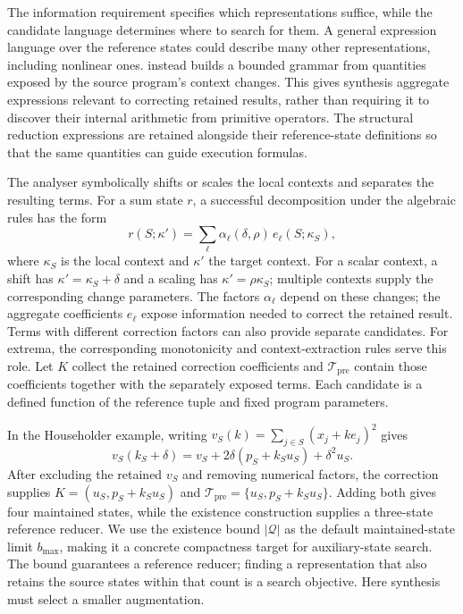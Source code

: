 The information requirement specifies which representations suffice, while the candidate language determines where to search for them.
A general expression language over the reference states could describe many other representations, including nonlinear ones.
\sys instead builds a bounded grammar from quantities exposed by the source program's context changes.
This gives synthesis aggregate expressions relevant to correcting retained results, rather than requiring it to discover their internal arithmetic from primitive operators.
The structural reduction expressions are retained alongside their reference-state definitions so that the same quantities can guide execution formulas.

The analyser symbolically shifts or scales the local contexts and separates the resulting terms.
For a sum state $r$, a successful decomposition under the algebraic rules has the form
\begin{equation}
\label{eq:features}
r(S;\kappa')=\sum_{\ell}\alpha_\ell(\delta,\rho)\,e_\ell(S;\kappa_S),
\end{equation}
where $\kappa_S$ is the local context and $\kappa'$ the target context.
For a scalar context, a shift has $\kappa'=\kappa_S+\delta$ and a scaling has $\kappa'=\rho\kappa_S$; multiple contexts supply the corresponding change parameters.
The factors $\alpha_\ell$ depend on these changes; the aggregate coefficients $e_\ell$ expose information needed to correct the retained result.
Terms with different correction factors can also provide separate candidates.
For extrema, the corresponding monotonicity and context-extraction rules serve this role.
Let $K$ collect the retained correction coefficients and $\mathcal T_{\mathrm{pre}}$ contain those coefficients together with the separately exposed terms.
Each candidate is a defined function of the reference tuple and fixed program parameters.

In the Householder example, writing $v_S(k)=\sum_{j\in S}(x_j+ke_j)^2$ gives
\[
v_S(k_S+\delta)
 =v_S+2\delta(p_S+k_Su_S)+\delta^2u_S.
\]
After excluding the retained $v_S$ and removing numerical factors, the correction supplies $K=(u_S,p_S+k_Su_S)$ and $\mathcal T_{\mathrm{pre}}=\{u_S,p_S+k_Su_S\}$.
Adding both gives four maintained states, while the existence construction supplies a three-state reference reducer.
We use the existence bound $|\mathcal Q|$ as the default maintained-state limit $b_{\max}$, making it a concrete compactness target for auxiliary-state search.
The bound guarantees a reference reducer; finding a representation that also retains the source states within that count is a search objective.
Here synthesis must select a smaller augmentation.

